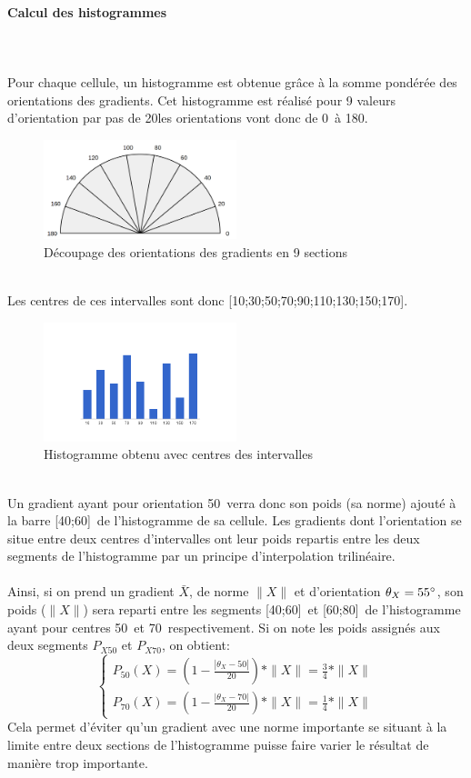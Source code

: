\documentclass[12pt]{article}
\begin{document}
\paragraph{Calcul des histogrammes}~\\
\\
Pour chaque cellule, un histogramme est obtenue grâce à la somme pondérée des orientations des gradients. Cet histogramme est réalisé pour 9 valeurs d'orientation par pas de 20\degree les orientations vont donc de 0\degree~à 180\degree.
\begin{figure}[!ht]
    \label{fig:orientations}
    \centering
	    \includegraphics[width=0.5\textwidth]{img/angles.png}
	    \caption{Découpage des orientations des gradients en 9 sections}
\end{figure}
\\
Les centres de ces intervalles sont donc [10;30;50;70;90;110;130;150;170]\degree.
\begin{figure}[!ht]
    \label{fig:histo}
    \centering
	    \includegraphics[width=0.5\textwidth]{img/histo.png}
	    \caption{Histogramme obtenu avec centres des intervalles}
\end{figure}
\\
Un gradient ayant pour orientation 50\degree~verra donc son poids (sa norme) ajouté à la barre [40;60]\degree~de l'histogramme de sa cellule.
Les gradients dont l'orientation se situe entre deux centres d'intervalles ont leur poids repartis entre les deux segments de l'histogramme par un principe d'interpolation trilinéaire.\\
\\
Ainsi, si on prend un gradient $\bar{X}$, de norme $\|X\|$ et d'orientation $\theta_{X}=55\degree$, son poids ($\|X\|$) sera reparti entre les segments [40;60]\degree~et [60;80]\degree~de l'histogramme ayant pour centres 50\degree~et 70\degree~respectivement.
Si on note les poids assignés aux deux segments $P_{X50}$ et $P_{X70}$, on obtient:
\[
\begin{cases}
P_{50}(X)=\left ( 1-\frac{|\theta_{X}-50|}{20} \right )*\|X\| = \frac{3}{4}*\|X\|\\
P_{70}(X)=\left ( 1-\frac{|\theta_{X}-70|}{20} \right )*\|X\| = \frac{1}{4}*\|X\|
\end{cases}
\]
Cela permet d'éviter qu'un gradient avec une norme importante se situant à la limite entre deux sections de l'histogramme puisse faire varier le résultat de manière trop importante.
\end{document}
